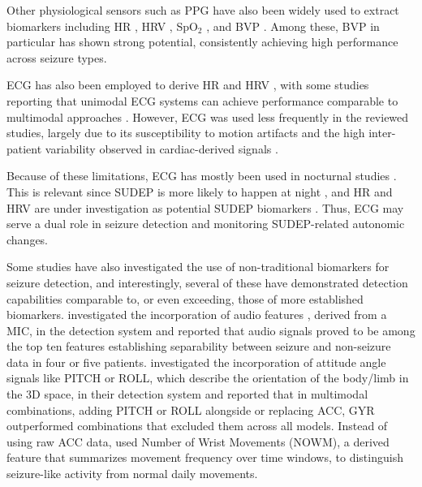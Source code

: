 Other physiological sensors such as PPG have also been widely used to extract biomarkers including HR \cite{Cogan2017-lg, Nasseri2021-xn, Vakilna2024-hk, Xu2022-tx, Arends2018-ew, Jiang2022-zu}, HRV \cite{Vakilna2024-hk, Jiang2022-zu}, SpO$_2$ \cite{Cogan2017-lg}, and BVP \cite{Nasseri2021-xn, Tang2021-td, Yu2023-ss}. Among these, BVP in particular has shown strong potential, consistently achieving high performance across seizure types.

ECG has also been employed to derive HR \cite{Van_Andel2017-yx, Hegarty-Craver2021-hk, De_Cooman2018-pq} and HRV \cite{Hegarty-Craver2021-hk}, with some studies reporting that unimodal ECG systems can achieve performance comparable to multimodal approaches \cite{De_Cooman2018-pq, Hegarty-Craver2021-hk}. However, ECG was used less frequently in the reviewed studies, largely due to its susceptibility to motion artifacts \cite{Van_Andel2017-yx} and the high inter-patient variability observed in cardiac-derived signals \cite{De_Cooman2018-pq, Van_Andel2017-yx}.

Because of these limitations, ECG has mostly been used in nocturnal studies \cite{Van_Andel2017-yx, De_Cooman2018-pq}. This is relevant since SUDEP is more likely to happen at night \cite{Friedman2022-mo}, and HR and HRV are under investigation as potential SUDEP biomarkers \cite{Barot2019-nx}. Thus, ECG may serve a dual role in seizure detection and monitoring SUDEP-related autonomic changes.

Some studies have also investigated the use of non-traditional biomarkers for seizure detection, and interestingly, several of these have demonstrated detection capabilities comparable to, or even exceeding, those of more established biomarkers. \cite{Hamlin2021-sd} investigated the incorporation of audio features  , derived from a MIC, in the detection system and reported that audio signals proved to be among the top ten features establishing separability between seizure and non-seizure data in four or five patients. \cite{Wang2025-ql} investigated the incorporation of attitude angle signals like PITCH or ROLL, which describe the orientation of the body/limb in the 3D space, in their detection system and reported that in multimodal combinations, adding PITCH or ROLL alongside or replacing ACC, GYR outperformed combinations that excluded them across all models. Instead of using raw ACC data, \cite{Xu2022-tx} used Number of Wrist Movements (NOWM), a derived feature that summarizes movement frequency over time windows, to distinguish seizure-like activity from normal daily movements.

